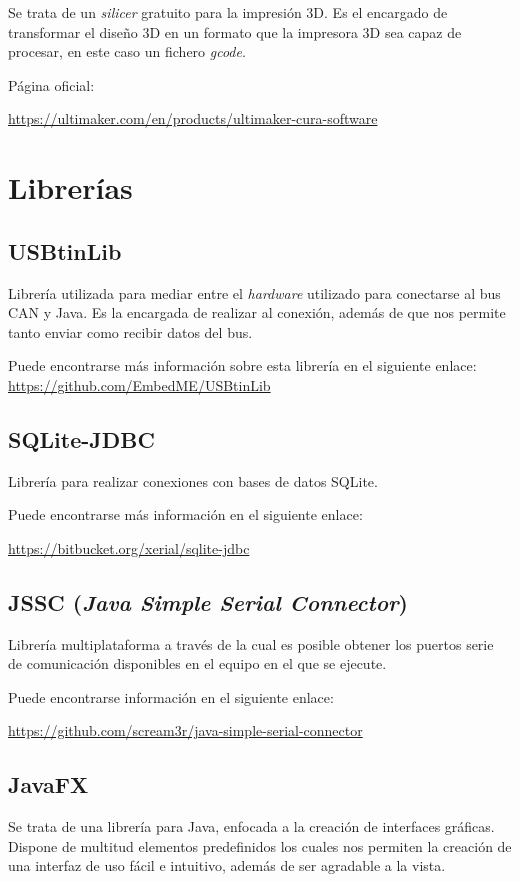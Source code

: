 Se trata de un \emph{silicer} gratuito para la impresión 3D. Es el encargado de transformar el diseño 3D en un formato que la impresora 3D sea capaz de procesar, en este caso un fichero \emph{gcode}.

Página oficial:

\url{https://ultimaker.com/en/products/ultimaker-cura-software}

\section{Librerías}\label{librerias}

\subsection{USBtinLib}\label{usbtinlib}

Librería utilizada para mediar entre el \emph{hardware} utilizado para conectarse al bus CAN y Java. Es la encargada de realizar al conexión, además de que nos permite tanto enviar como recibir datos del bus. 

Puede encontrarse más información sobre esta librería en el siguiente enlace:
\url{https://github.com/EmbedME/USBtinLib}

\subsection{SQLite-JDBC}\label{sqlite-jdbc}

Librería para realizar conexiones con bases de datos SQLite.

Puede encontrarse más información en el siguiente enlace: 

\url{https://bitbucket.org/xerial/sqlite-jdbc}

\subsection{JSSC (\emph{Java Simple Serial Connector})}\label{jssc_java_simple_serial_connector}

Librería multiplataforma a través de la cual es posible obtener los puertos serie de comunicación disponibles en el equipo en el que se ejecute.

Puede encontrarse información en el siguiente enlace:

\url{https://github.com/scream3r/java-simple-serial-connector}


\subsection{JavaFX}\label{javafx}
Se trata de una librería para Java, enfocada a la creación de interfaces gráficas. Dispone de multitud elementos predefinidos los cuales nos permiten la creación de una interfaz de uso fácil e intuitivo, además de ser agradable a la vista.

